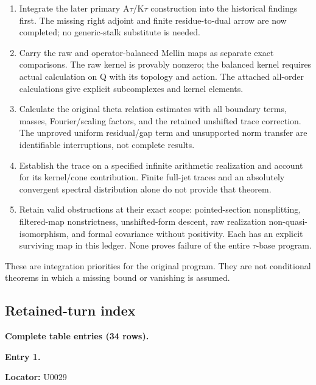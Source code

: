 \begin{enumerate}
\def\labelenumi{\arabic{enumi}.}
\tightlist
\item
  Integrate the later primary
  A\allowbreak{}\ensuremath{τ}\allowbreak{}/K\allowbreak{}\ensuremath{τ}\allowbreak{}
  construction into the historical findings first. The missing right
  adjoint and finite residue-to-dual arrow are now completed; no
  generic-stalk substitute is needed.
\item
  Carry the raw and operator-balanced Mellin maps as separate exact
  comparisons. The raw kernel is provably nonzero; the balanced kernel
  requires actual calculation on Q with its topology and action. The
  attached all-order calculations give explicit subcomplexes and kernel
  elements.
\item
  Calculate the original theta relation estimates with all boundary
  terms, masses, Fourier/scaling factors, and the retained unshifted
  trace correction. The unproved uniform residual/gap term and
  unsupported norm transfer are identifiable interruptions, not complete
  results.
\item
  Establish the trace on a specified infinite arithmetic realization and
  account for its kernel/cone contribution. Finite full-jet traces and
  an absolutely convergent spectral distribution alone do not provide
  that theorem.
\item
  Retain valid obstructions at their exact scope: pointed-section
  nonsplitting, filtered-map nonstrictness, unshifted-form descent, raw
  realization non-quasi-isomorphism, and formal covariance without
  positivity. Each has an explicit surviving map in this ledger. None
  proves failure of the entire
  \allowbreak{}\ensuremath{τ}\allowbreak{}-base program.
\end{enumerate}

These are integration priorities for the original program. They are not
conditional theorems in which a missing bound or vanishing is assumed.

\subsection{Retained-turn index}\label{TranscriptLedgerStage:retained-turn-index}

\textbf{Complete table entries (34 rows).}


\textbf{Entry 1.}

\textbf{Locator:} U0029

